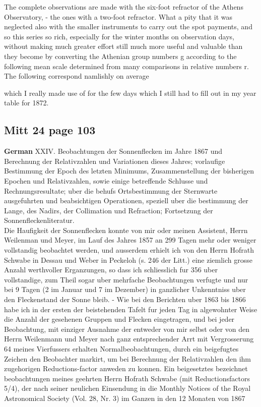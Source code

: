 \documentclass[12pt]{article}
\begin{document}
The complete observations are made with the six-foot refractor of the Athens Observatory, - the ones with a two-foot refractor. What a pity that it was neglected also with the smaller instruments to carry out the spot payments, and so this series so rich, especially for the winter months on observation days, without making much greater effort still much more useful and valuable than they become by converting the Athenian group numbers g according to the following mean scale determined from many comparisons in relative numbers r. The following correspond namlishly on average

which I really made use of for the few days which I still had to fill out in my year table for 1872.

\subsection{Mitt 24 page 103}\label{mitt:mitt 24 page 103}

\textbf{German}
XXIV. Beobachtungen der Sonnenflecken im Jahre 1867 und Berechnung der Relativzahlen und Variationen dieses Jahres; vorlaufige Bestimmung der Epoch des letzten Minimums, Zusammenstellung der bisherigen Epochen und Relativzahlen, sowie einige betreffende Schlusse und Rechnungsresultate; uber die behufs Ortsbestimmung der Sternwarte ausgefuhrten und beabsichtigen Operationen, speziell uber die bestimmung der Lange, des Nadirs, der Collimation und Refraction; Fortsetzung der Sonnenfleckenliteratur.\\

Die Haufigkeit der Sonnenflecken konnte von mir oder meinen Assistent, Herrn Weilenman und Meyer, im Lauf des Jahres 1857 an 299 Tagen mehr oder weniger vollstandig beobachtet werden, und ausserdem erhielt ich von den Herrn Hofrath Schwabe in Dessau und Weber in Peckeloh (s. 246 der Litt.) eine ziemlich grosse Anzahl werthvoller Erganzungen, so dass ich schliesslich fur 356 uber vollstandige, zum Theil sogar uber mehrfache Beobachtungen verfugte und nur bei 9 Tagen (2 im Januar und 7 im Dezember) in ganzlicher Unkenntniss uber den Fleckenstand der Sonne bleib. - Wie bei den Berichten uber 1863 bis 1866 habe ich in der ersten der beistehenden Tafelt fur jeden Tag in algewohnter Weise die Anzahl der gesehenen Gruppen und Flecken eingetragen, und bei jeder Beobachtung, mit einziger Ausnahme der entweder von mir selbst oder von den Herrn Weilenmann und Meyer nach ganz entsprechender Arrt mit Vergrosserung 64 meines Vierfussers erhalten Normalbeobachtungen, durch ein beigefugtes Zeichen den Beobachter markirt, um bei Berechnung der Relativzahlen den ihm zugehorigen Reductions-factor anweden zu konnen. Ein beigesetztes \dag bezeichnet beobachtungen meines geehrten Herrn Hofrath Schwabe (mit Reductionsfactors 5/4), der nach seiner neulichen Einsendung in die Monthly Notices of the Royal Astronomical Society (Vol. 28, Nr. 3) im Ganzen in den 12 Monaten von 1867\\
\end{document}
